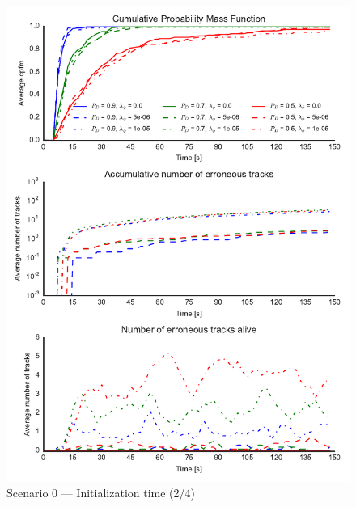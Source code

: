\begin{figure}
\centering
\includegraphics{Figures/plots/Scenario0_Init-Time(2-4).pdf}
\caption{Scenario 0 --- Initialization time (2/4)}\label{fig:init0_time_2-4}
\end{figure}

